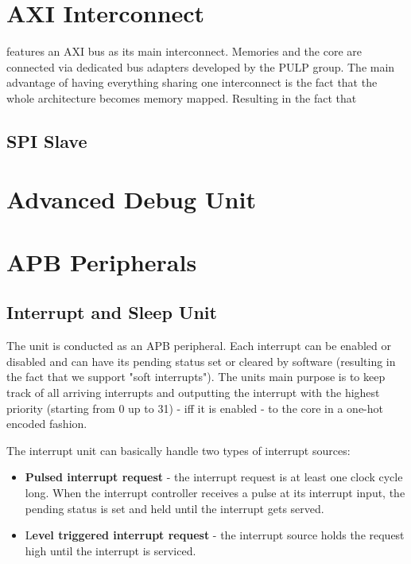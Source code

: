 \section{AXI Interconnect}

\pulpino features an AXI bus as its main interconnect. Memories and the core are connected via dedicated bus adapters developed by the PULP group. The main advantage of having everything sharing one interconnect is the fact that the whole architecture becomes memory mapped. Resulting in the fact that 


\subsection{SPI Slave}
\label{subsec:spi_slave}

\section{Advanced Debug Unit}

\section{APB Peripherals}

\subsection{Interrupt and Sleep Unit}

The unit is conducted as an APB peripheral. Each interrupt can be enabled or disabled and can have its pending status set or cleared by software (resulting in the fact that we support "soft interrupts"). The units main purpose is to keep track of all arriving interrupts and outputting the interrupt with the highest priority (starting from 0 up to 31) - iff it is enabled -  to the core in a one-hot encoded fashion. 

The interrupt unit can basically handle two types of interrupt sources:

\begin{itemize}
    \item \textbf{Pulsed interrupt request} - the interrupt request is at least one clock cycle long. When the interrupt controller receives a pulse at its interrupt input, the pending status is set and held until the interrupt gets served.
    \item L\textbf{evel triggered interrupt request} - the interrupt source holds the request high until the interrupt is serviced.
\end{itemize}

